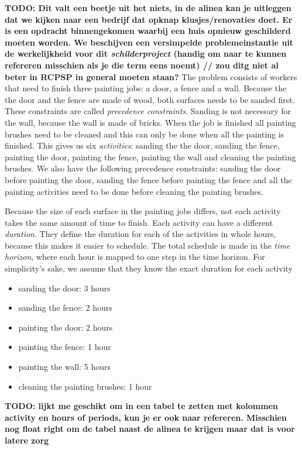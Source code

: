 \documentclass{article}
\theoremstyle{definition}
\newcommand{\TODO}[1]{{\color{red}\textbf{TODO: #1}}}
\begin{document}
\TODO{Dit valt een beetje uit het niets, in de alinea kan je uitleggen dat we kijken naar een bedrijf dat opknap klusjes/renovaties doet. Er is een opdracht binnengekomen waarbij een huis opnieuw geschilderd moeten worden. We beschijven een versimpelde problemeinstantie uit de werkelijkheid voor dit \emph{schilderproject} (handig om naar te kunnen refereren misschien als je die term eens noemt) // zou ditg niet al beter in RCPSP in general moeten staan?}
The problem consists of workers that need to finish three painting jobs: a door, a fence and a wall.
Because the the door and the fence are made of wood, both surfaces needs to be sanded first.
These constraints are called \emph{precedence constraints}.
Sanding is not necessary for the wall, because the wall is made of bricks.
When the job is finished all painting brushes need to be cleaned and this can only be done when all the painting is finished.
This gives us six \emph{activities}: sanding the the door, sanding the fence,  painting the door, painting the fence, painting the wall and cleaning the painting brushes.
We also have the following precedence constraints: sanding the door before painting the door, sanding the fence before painting the fence and all the painting activities need to be done before cleaning the painting brushes.

Because the size of each surface in the painting jobs differs, not each activity takes the same amount of time to finish.
Each activity can have a different \emph{duration}.
They define the duration for each of the activities in whole hours, because this makes it easier to schedule.
The total schedule is made in the \emph{time horizon}, where each hour is mapped to one step in the time horizon.
For simplicity's sake, we assume that they know the exact duration for each activity
\begin{itemize}
\item sanding the door: 3 hours
\item sanding the fence: 2 hours
\item painting the door: 2 hours
\item painting the fence: 1 hour
\item painting the wall: 5 hours
\item cleaning the painting brushes: 1 hour
\end{itemize}
\TODO{lijkt me geschikt om in een tabel te zetten met kolommen activity en hours of periods, kun je er ook naar refereren. Misschien nog float right om de tabel naast de alinea te krijgen maar dat is voor latere zorg}
\end{document}
